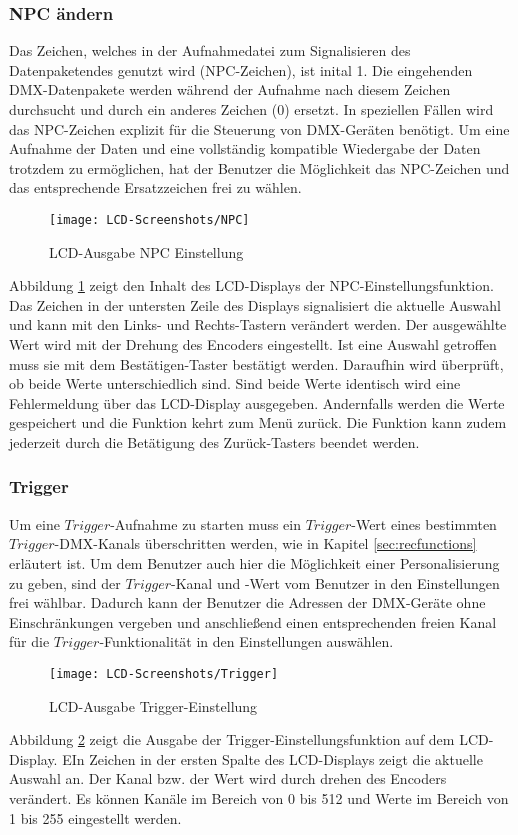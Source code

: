 \subsubsection{NPC ändern}
Das Zeichen, welches in der Aufnahmedatei zum Signalisieren des Datenpaketendes genutzt wird (NPC-Zeichen), ist inital 1. Die eingehenden DMX-Datenpakete werden während der Aufnahme nach diesem Zeichen durchsucht und durch ein anderes Zeichen (0) ersetzt. In speziellen Fällen wird das NPC-Zeichen explizit für die Steuerung von DMX-Geräten benötigt. Um eine Aufnahme der Daten und eine vollständig kompatible Wiedergabe der Daten trotzdem zu ermöglichen, hat der Benutzer die Möglichkeit das NPC-Zeichen und das entsprechende Ersatzzeichen frei zu wählen. 
\begin{figure}[h]
	\begin{center}
		\texttt{[image: LCD-Screenshots/NPC]}
		\caption{LCD-Ausgabe NPC Einstellung}
		\label{fig:npc}
	\end{center}
\end{figure}
Abbildung \ref{fig:npc} zeigt den Inhalt des LCD-Displays der NPC-Einstellungsfunktion. Das Zeichen in der untersten Zeile des Displays signalisiert die aktuelle Auswahl und kann mit den Links- und Rechts-Tastern verändert werden. Der ausgewählte Wert wird mit der Drehung des Encoders eingestellt. Ist eine Auswahl getroffen muss sie mit dem Bestätigen-Taster bestätigt werden. Daraufhin wird überprüft, ob beide Werte unterschiedlich sind. Sind beide Werte identisch wird eine Fehlermeldung über das LCD-Display ausgegeben. Andernfalls werden die Werte gespeichert und die Funktion kehrt zum Menü zurück. Die Funktion kann zudem jederzeit durch die Betätigung des Zurück-Tasters beendet werden.
\subsubsection{Trigger}
Um eine $Trigger$-Aufnahme zu starten muss ein $Trigger$-Wert eines bestimmten $Trigger$-DMX-Kanals überschritten werden, wie in Kapitel \ref{sec:recfunctions} erläutert ist. Um dem Benutzer auch hier die Möglichkeit einer Personalisierung zu geben, sind der $Trigger$-Kanal und -Wert vom Benutzer in den Einstellungen frei wählbar. Dadurch kann der Benutzer die Adressen der DMX-Geräte ohne Einschränkungen vergeben und anschließend einen entsprechenden freien Kanal für die $Trigger$-Funktionalität in den Einstellungen auswählen. 
\begin{figure}[h]
	\begin{center}
		\texttt{[image: LCD-Screenshots/Trigger]}
		\caption{LCD-Ausgabe Trigger-Einstellung}
		\label{fig:trig}
	\end{center}
\end{figure}
Abbildung \ref{fig:trig} zeigt die Ausgabe der Trigger-Einstellungsfunktion auf dem LCD-Display. EIn Zeichen in der ersten Spalte des LCD-Displays zeigt die aktuelle Auswahl an. Der Kanal bzw. der Wert wird durch drehen des Encoders verändert. Es können Kanäle im Bereich von 0 bis 512 und Werte im Bereich von 1 bis 255 eingestellt werden. 
